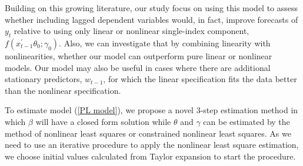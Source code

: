 \documentclass[a4paper,12pt,times,numbered,print,index]{report}
\numberwithin{equation}{section}
\begin{document}
Building on this growing literature, our study focus on using this model to assess whether including lagged dependent variables would, in fact, improve forecasts of $y_{t}$ relative to using only linear or nonlinear single-index component, $f\left( x_{t-1}^{\prime }\theta_0; \gamma_0\right)$. Also, we can investigate that by combining linearity with nonlinearities, whether our model can outperform pure linear or nonlinear models. Our model may also be useful in cases where there are additional stationary predictors, $w_{t-1}$, for which the linear specification fits the data better than the nonlinear specification.

To estimate model (\ref{PL model}), we propose a novel 3-step estimation method in which $\beta$ will have a closed form solution while $\theta$ and $\gamma$ can be estimated by the method of nonlinear least squares or constrained nonlinear least squares. As we need to use an iterative procedure to apply the nonlinear least square estimation, we choose initial values calculated from Taylor expansion to start the procedure.




\end{document}
